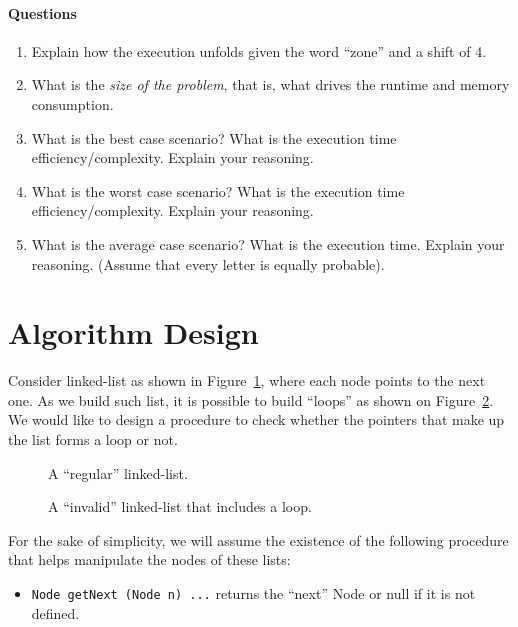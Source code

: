 \documentclass{article}
\begin{document}
\paragraph{Questions}
\begin{enumerate}
\item Explain how the execution unfolds given the word ``zone'' and a
  shift of 4.
\item What is the \emph{size of the problem}, that is, what drives the
  runtime and memory consumption.
\item What is the best case scenario? What is the execution
  time efficiency/complexity. Explain your reasoning.
\item What is the worst case scenario? What is the execution
  time efficiency/complexity. Explain your reasoning.
\item What is the average case scenario? What is the execution
  time. Explain your reasoning. (Assume that every letter is equally
  probable).
\end{enumerate}


\section{Algorithm Design}
Consider linked-list as shown in Figure~\ref{fig:list}, where each
node points to the next one. As we build such list, it is possible to
build ``loops'' as shown on Figure~\ref{fig:list-loop}. We would
like to design a procedure to check whether the pointers that make up
the list forms a loop or not.

\begin{figure}[htbp]
  \begin{center}
    
  \end{center}
  \caption{A ``regular'' linked-list.}
  \label{fig:list}
\end{figure}

\begin{figure}[htbp]
  \begin{center}
    
  \end{center}
  \caption{A ``invalid'' linked-list that includes a loop.}
  \label{fig:list-loop}
\end{figure}

For the sake of simplicity, we will assume the existence of the
following procedure that helps manipulate the nodes of these
lists:
\begin{itemize}
\item \texttt{Node getNext (Node n) {...}} returns the ``next''
  Node or null if it is not defined.
\end{itemize}
\end{document}

